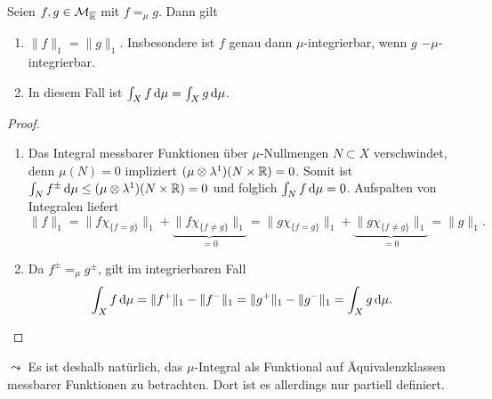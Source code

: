 \begin{lemma}
\begin{mdframed}
Seien $f,g \in \mathcal{M}_{\overline{\mathbb{R}}}$ mit $f=_\mu g$. Dann gilt
\begin{enumerate}
\item $\|f\|_1=\|g\|_1$. Insbesondere ist $f$ genau dann $\mu$-integrierbar, wenn $g$ $-\mu$-integrierbar.
\item In diesem Fall ist $\int_X f \, \mathrm{d}\mu =\int_X g \, \mathrm{d} \mu$.
\end{enumerate}
\end{mdframed}
\begin{proof}
\begin{enumerate}
\item Das Integral messbarer Funktionen über $\mu$-Nullmengen $N\subset X$ verschwindet, denn $\mu(N)=0$ impliziert $(\mu\otimes \lambda^1)(N\times \mathbb{R})=0$. Somit ist ${\int_Nf^\pm \, \mathrm{d}\mu}\leq (\mu \otimes \lambda^1)(N\times \mathbb{R})=0$ und folglich $\int_N f\, \mathrm{d}\mu=0$. Aufspalten von Integralen liefert
$$
\|f\|_1=\|f\chi_{\{f=g\}}\|_1+\underbrace{\|f\chi_{\{f\neq g\}}\|_1}_{=0}= \|g\chi_{\{f=g\}}\|_1+\underbrace{\|g\chi_{\{f\neq g\}}\|_1}_{=0}=\|g\|_1.
$$
\item Da $f^\pm=_\mu g^\pm$, gilt im integrierbaren Fall
$$
\int_Xf\, \mathrm{d}\mu =\|f^+\|_1-\|f^-\|_1=\|g^+\|_1-\|g^-\|_1=\int_X g\, \mathrm{d} \mu.
$$
\end{enumerate}
\end{proof}
\end{lemma}
$\leadsto$ Es ist deshalb natürlich, das $\mu$-Integral als Funktional auf Äquivalenzklassen messbarer Funktionen zu betrachten. Dort ist es allerdings nur partiell definiert.
%

